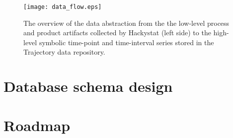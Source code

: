 \begin{figure}[tbp]
   \centering
   \texttt{[image: data\_flow.eps]}
   \caption{The overview of the data abstraction from the the low-level process and product artifacts collected by Hackystat (left side) to the high-level symbolic time-point and time-interval series stored in the Trajectory data repository.}
   \label{fig:data_flow}
\end{figure}

\section{Database schema design}

\section{Roadmap}
